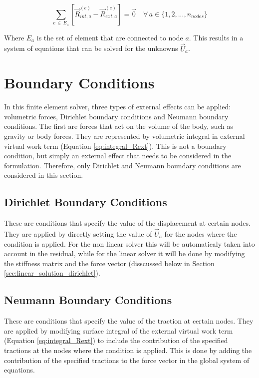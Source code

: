 \begin{equation} \label{eq:assembled_eq}
    \sum_{e \, \in \, E_a} \left[ \vec{R}_{int, a}^{(e)} - \vec{R}_{ext, a}^{(e)} \right] = \vec{0} \quad \forall \, a \in \{1, 2, ..., n_{nodes}\}
\end{equation}

Where $E_a$ is the set of element that are connected to node $a$. This results in a system of equations that can be solved for the unknowns $\vec{U}_a$.

\section{Boundary Conditions}

In this finite element solver, three types of external effects can be applied: volumetric forces, Dirichlet boundary conditions and Neumann boundary conditions. The first are forces that act on the volume of the body, such as gravity or body forces. They are represented by volumetric integral in external virtual work term (Equation \ref{eq:integral_Rext}). This is not a boundary condition, but simply an external effect that needs to be considered in the formulation. Therefore, only Dirichlet and Neumann boundary conditions are considered in this section.

\subsection{Dirichlet Boundary Conditions}

These are conditions that specify the value of the displacement at certain nodes. They are applied by directly setting the value of $\vec{U}_a$ for the nodes where the condition is applied. For the non linear solver this will be automaticaly taken into account in the residual, while for the linear solver it will be done by modifying the stiffness matrix and the force vector (disscussed below in Section \ref{sec:linear_solution_dirichlet}). 

\subsection{Neumann Boundary Conditions}

These are conditions that specify the value of the traction at certain nodes. They are applied by modifying surface integral of the external virtual work term (Equation \ref{eq:integral_Rext}) to include the contribution of the specified tractions at the nodes where the condition is applied. This is done by adding the contribution of the specified tractions to the force vector in the global system of equations.

